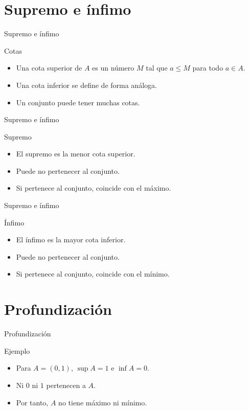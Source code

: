 \documentclass[aspectratio=169,11pt]{beamer}
\begin{document}
\section{Supremo e ínfimo}

\begin{frame}{Supremo e ínfimo}
\begin{block}{Cotas}
\begin{itemize}
  \item Una cota superior de \(A\) es un número \(M\) tal que \(a\leq M\) para todo \(a\in A\).
  \item Una cota inferior se define de forma análoga.
  \item Un conjunto puede tener muchas cotas.
\end{itemize}
\end{block}
\end{frame}

\begin{frame}{Supremo e ínfimo}
\begin{block}{Supremo}
\begin{itemize}
  \item El supremo es la menor cota superior.
  \item Puede no pertenecer al conjunto.
  \item Si pertenece al conjunto, coincide con el máximo.
\end{itemize}
\end{block}
\end{frame}

\begin{frame}{Supremo e ínfimo}
\begin{block}{Ínfimo}
\begin{itemize}
  \item El ínfimo es la mayor cota inferior.
  \item Puede no pertenecer al conjunto.
  \item Si pertenece al conjunto, coincide con el mínimo.
\end{itemize}
\end{block}
\end{frame}

\section{Profundización}

\begin{frame}{Profundización}
\begin{block}{Ejemplo}
\begin{itemize}
  \item Para \(A=(0,1)\), \(\sup A=1\) e \(\inf A=0\).
  \item Ni \(0\) ni \(1\) pertenecen a \(A\).
  \item Por tanto, \(A\) no tiene máximo ni mínimo.
\end{itemize}
\end{block}
\end{frame}
\end{document}
